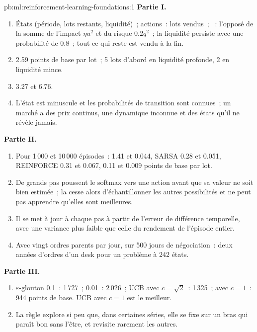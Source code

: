 \begin{solution}{pb:ml:reinforcement-learning-foundations:1}
\textbf{Partie I.}
\begin{enumerate}
\item États (période, lots restants, liquidité)~; actions~: lots vendus~; ~: l'opposé de la somme de l'impact $\eta u^2$ et du risque $0.2q^2$~;
la liquidité persiste avec une probabilité de 0.8~; tout ce qui reste est vendu à la fin.
\item 2.59 points de base par lot~; 5 lots d'abord en liquidité profonde, 2 en liquidité mince.
\item 3.27 et 6.76.
\item L'état est minuscule et les probabilités de transition sont connues~; un marché a des prix continus, une dynamique inconnue et
des états qu'il ne révèle jamais.
\end{enumerate}
\textbf{Partie II.}
\begin{enumerate}[resume]
\item Pour 1\,000 et 10\,000 épisodes~:  1.41 et 0.044, SARSA 0.28 et 0.051, REINFORCE 0.31 et 0.067,  0.11 et 0.009 points de base par lot.
\item De grands pas poussent le softmax vers une action avant que sa valeur ne soit bien estimée~; la  cesse alors d'échantillonner les
autres possibilités et ne peut pas apprendre qu'elles sont meilleures.
\item Il se met à jour à chaque pas à partir de l'erreur de différence temporelle, avec une variance plus faible que celle du rendement de l'épisode entier.
\item Avec vingt ordres parents par jour, sur 500 jours de négociation~: deux années d'ordres d'un desk pour un problème à 242 états.
\end{enumerate}
\textbf{Partie III.}
\begin{enumerate}[resume]
\item $\varepsilon$-glouton 0.1~: 1\,727~; 0.01~: 2\,026~; UCB avec $c = \sqrt2$~: 1\,325~; avec $c = 1$~: 944 points de base. UCB avec
$c = 1$ est le meilleur.
\item La règle explore si peu que, dans certaines séries, elle se fixe sur un bras qui paraît bon sans l'être, et revisite rarement les autres.

\end{enumerate}
\end{solution}
